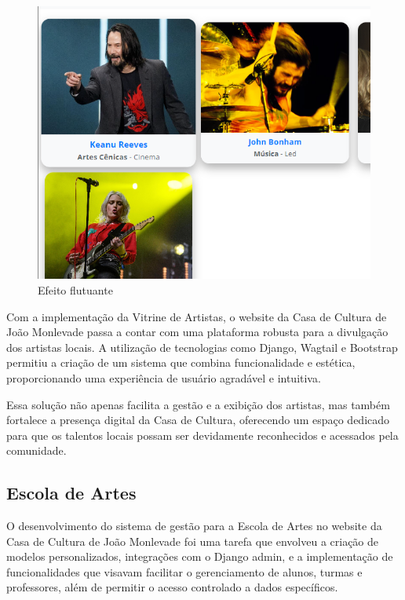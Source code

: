 \begin{figure}[htb]
	\caption{\label{fig_flutuante}Efeito flutuante}
	\begin{center}
	    \includegraphics[scale=0.35]{./img/vitrine_de_artistas_hover.png}
	\end{center}
\end{figure}

Com a implementação da Vitrine de Artistas, o website da Casa de Cultura de João Monlevade passa a contar com uma plataforma robusta para a divulgação dos artistas locais. A utilização de tecnologias como Django, Wagtail e Bootstrap permitiu a criação de um sistema que combina funcionalidade e estética, proporcionando uma experiência de usuário agradável e intuitiva.

Essa solução não apenas facilita a gestão e a exibição dos artistas, mas também fortalece a presença digital da Casa de Cultura, oferecendo um espaço dedicado para que os talentos locais possam ser devidamente reconhecidos e acessados pela comunidade.

\subsection{Escola de Artes}

O desenvolvimento do sistema de gestão para a Escola de Artes no website da Casa de Cultura de João Monlevade foi uma tarefa que envolveu a criação de modelos personalizados, integrações com o Django admin, e a implementação de funcionalidades que visavam facilitar o gerenciamento de alunos, turmas e professores, além de permitir o acesso controlado a dados específicos.

